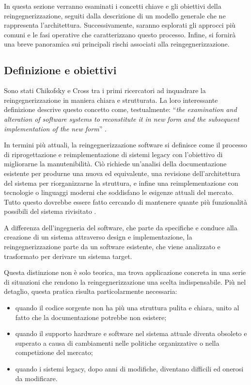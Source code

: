 In questa sezione verranno esaminati i concetti chiave e gli obiettivi della reingegnerizzazione, seguiti dalla descrizione di un modello generale che ne rappresenta l'architettura. Successivamente, saranno esplorati gli approcci più comuni e le fasi operative che caratterizzano questo processo. Infine, si fornirà una breve panoramica sui principali rischi associati alla reingegnerizzazione.

\subsection{Definizione e obiettivi}
Sono stati Chikofsky e Cross tra i primi ricercatori ad inquadrare la reingegnerizzazione in maniera chiara e strutturata. La loro interessante definizione descrive questo concetto come, testualmente: ``\textit{the examination and alteration of software systems to reconstitute it in new form and the subsequent implementation of the new form}'' \cite{DBLP:journals/software/ChikofskyC90}.

In termini più attuali, la reingegnerizzazione software si definisce come il processo di riprogettazione e reimplementazione di sistemi legacy con l'obiettivo di migliorarne la manutenibilità. Ciò richiede un'analisi della documentazione esistente per produrne una nuova ed equivalente, una revisione dell'architettura del sistema per riorganizzarne la struttura, e infine una reimplementazione con tecnologie o linguaggi moderni che soddisfano le esigenze attuali del mercato. Tutto questo dovrebbe essere fatto cercando di mantenere quante più funzionalità possibili del sistema rivisitato \cite{sommerville2011software}.

A differenza dell'ingegneria del software, che parte da specifiche e conduce alla creazione di un sistema attraverso design e implementazione, la reingegnerizzazione parte da un software esistente, che viene analizzato e trasformato per derivare un sistema target.

Questa distinzione non è solo teorica, ma trova applicazione concreta in una serie di situazioni che rendono la reingegnerizzazione una scelta indispensabile. Più nel detaglio, questa pratica risulta particolarmente necessaria:
\begin{itemize}
  \item quando il codice sorgente non ha più una struttura pulita e chiara, unito al fatto che la documentazione potrebbe non esistere;
  \item quando il supporto hardware e software nel sistema attuale diventa obsoleto e superato a causa di cambiamenti nelle politiche organizzative o nella competizione del mercato;
  \item quando i sistemi legacy, dopo anni di modifiche, diventano difficili ed onerosi da modificare.
\end{itemize}

